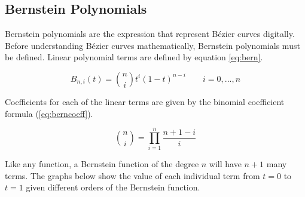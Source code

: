 \documentclass[12pt,letterpaper]{article}
\begin{document}
\subsection{Bernstein Polynomials}
Bernstein polynomials are the expression that represent B\'ezier curves digitally. Before understanding B\'ezier curves mathematically, Bernstein polynomials must be defined. Linear polynomial terms are defined by equation \ref{eq:bern}. 

\begin{equation}
    \label{eq:bern}
    B_{n,i}(t) = \binom{n}{i} t^i (1-t)^{n-i} \qquad
    i=0,...,n
\end{equation}


Coefficients for each of the linear terms are given by the binomial coefficient formula (\ref{eq:berncoeff}). 

\begin{equation}
    \label{eq:berncoeff}
    \binom{n}{i} = \displaystyle\prod_{i=1}^{n} \frac{n+1-i}{i}
\end{equation}

Like any function, a Bernstein function of the degree $n$ will have $n+1$ many terms. The graphs below show the value of each individual term from $t=0$ to $t=1$ given different orders of the Bernstein function. 
\end{document}
